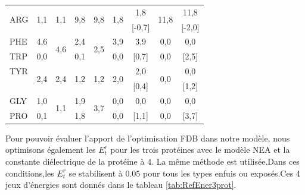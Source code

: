 \begin{table}[!htbp]
\begin{tabular}{l|cccc|cccc}
\hline
\multirow{2}{*}{ARG} & \multirow{2}{*}{1,1} & \multirow{2}{*}{1,1}   & \multirow{2}{*}{9,8}  & \multirow{2}{*}{9,8}   & \multirow{2}{*}{1,8} & 1,8                      & \multirow{2}{*}{11,8} & 11,8    \\
                     &                      &                        &                      &                         &                      & [-0,7]                    &                      & [-2,0]   \\
\hline
PHE                  & 4,6                  & \multirow{2}{*}{4,6}   & 2,4                  & \multirow{2}{*}{2,5}    &  3,9                 & 3,9                      & 0,0 & 0,0 \\
TRP                  & 0,0                  &                        & 0,1                  &                         &  0,0                 & [0,7]                    & 0,0 & [2,5]               \\
\hline
TYR                  & \multirow{2}{*}{2,4} & \multirow{2}{*}{2,4}  & \multirow{2}{*}{1,2}  &   \multirow{2}{*}{1,2}  &  \multirow{2}{*}{2,0} & 2,0                     & \multirow{2}{*}{0,0}  & 0,0   \\
                     &                      &                        &                      &                         &                       & [0,4]                   &                      & [1,2]  \\
\hline
GLY                  & 1,0                  & \multirow{2}{*}{1,1}   & 1,9                  & \multirow{2}{*}{3,7}    &   0,0                &  0,0                     & 0,0 & 0,0 \\
PRO                  & 0,1                  &                        & 1,8                  &                         &   0,0                &  [1,1]                   & 0,0 & [3,7]\\
\hline

\end{tabular}
\label{tab:RefEner6}      
\end{table}


Pour pouvoir évaluer l'apport de l'optimisation FDB dans notre modèle, nous optimisons également les $E_t^r$ pour les trois protéines avec le modèle NEA et la constante diélectrique de la protéine à $4$. La même méthode est utilisée.Dans ces conditions,les $E_t^r$ se stabilisent à $0.05$ pour tous les types enfuis ou exposés.Ces 4 jeux d'énergies sont donnés dans le tableau \ref{tab:RefEner3prot}. 


